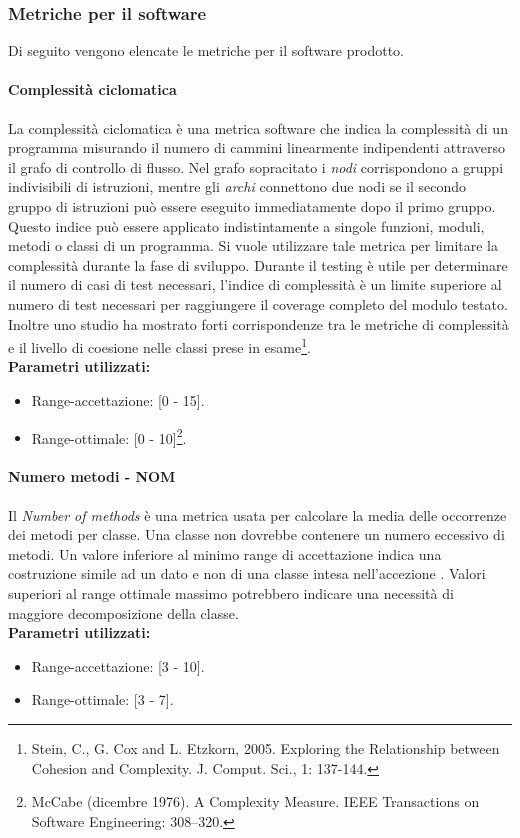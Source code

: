 		\subsubsection{Metriche per il software}
		Di seguito vengono elencate le metriche per il software prodotto.		
		
			\paragraph{Complessità ciclomatica}
			La complessità ciclomatica è una metrica software che indica la complessità di un programma misurando il numero di cammini linearmente indipendenti attraverso il grafo di controllo di flusso. Nel grafo sopracitato i \emph{nodi} corrispondono a gruppi indivisibili di istruzioni, mentre gli \emph{archi} connettono due nodi se il secondo gruppo di istruzioni può essere eseguito immediatamente dopo il primo gruppo.
			Questo indice può essere applicato indistintamente a singole funzioni, moduli, metodi o classi di un programma.
			Si vuole utilizzare tale metrica per limitare la complessità durante la fase di sviluppo.
			Durante il testing è utile per determinare il numero di casi di test necessari, l'indice di complessità è un limite superiore al numero di test necessari per raggiungere il coverage completo del modulo testato. Inoltre uno studio ha mostrato forti corrispondenze tra le metriche di complessità e il livello di coesione nelle classi prese in esame\footnote{Stein, C., G. Cox and L. Etzkorn, 2005. Exploring the Relationship between Cohesion and Complexity. J. Comput. Sci., 1: 137-144.}.\\
		\textbf{Parametri utilizzati:}
			\begin{itemize}
				\item Range-accettazione: [0 - 15].
				\item Range-ottimale: [0 - 10]\footnote{McCabe (dicembre 1976). A Complexity Measure. IEEE Transactions on Software Engineering: 308–320.}.
			\end{itemize}
			
			\paragraph{Numero metodi - NOM}
			Il \emph{Number of methods} è una metrica usata per calcolare la media delle occorrenze dei metodi per classe. Una classe non dovrebbe contenere un numero eccessivo di metodi. Un valore inferiore al minimo range di accettazione indica una costruzione simile ad un dato e non di una classe intesa nell'accezione . Valori superiori al range ottimale massimo potrebbero indicare una necessità di maggiore decomposizione della classe.\\
			\textbf{Parametri utilizzati:}
			\begin{itemize}
				\item Range-accettazione: [3 - 10].
				\item Range-ottimale: [3 - 7].
			\end{itemize}
			
